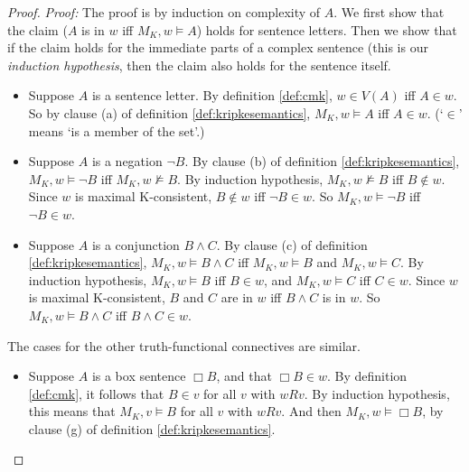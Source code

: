 \begin{proof}
  \emph{Proof:} The proof is by induction on complexity of $A$. We first show
  that the claim ($A$ is in $w$ iff $M_{K},w\models A$) holds for sentence
  letters. Then we show that if the claim holds for the immediate parts of a
  complex sentence (this is our \emph{induction hypothesis}, then the claim also
  holds for the sentence itself.%
  \vspace{-1mm}
  \begin{itemize}
    \itemsep0mm
    \item Suppose $A$ is a sentence letter. By definition \ref{def:cmk},
          $w\in V(A)$ iff $A\in w$. So by clause (a) of definition
          \ref{def:kripkesemantics}, $M_K,w \models A$ iff $A \in w$. (`$\in$'
          means `is a member of the set'.)
  
    \item Suppose $A$ is a negation $\neg B$. By clause (b) of definition
          \ref{def:kripkesemantics}, $M_K,w \models \neg B$ iff
          $M_K,w \not\models B$. By induction hypothesis, $M_K,w\not\models B$
          iff $B \not\in w$. Since $w$ is maximal K-consistent, $B \not\in w$
          iff $\neg B \in w$. So $M_K,w \models \neg B$ iff $\neg B \in w$.
        
    \item Suppose $A$ is a conjunction $B\land C$. By clause (c) of definition
          \ref{def:kripkesemantics}, $M_K,w \models B\land C$ iff
          $M_K,w \models B$ and $M_K,w \models C$. By induction hypothesis,
          $M_K,w \models B$ iff $B\in w$, and $M_K,w \models C$ iff $C\in w$.
          Since $w$ is maximal K-consistent, $B$ and $C$ are in $w$ iff
          $B\land C$ is in $w$.
          So $M_K,w \models B \land C$ iff $B \land C \in w$.
  \end{itemize}
  The cases for the other truth-functional connectives are similar.
  \begin{itemize}
    \itemsep0mm
    \item Suppose $A$ is a box sentence $\Box B$, and that $\Box B \in w$. By
          definition \ref{def:cmk}, it follows that $B\in v$ for all $v$ with
          $wRv$. By induction hypothesis, this means that $M_K,v \models B$ for
          all $v$ with $wRv$. And then $M_K,w \models \Box B$, by clause (g) of
          definition \ref{def:kripkesemantics}.


\end{itemize}
\end{proof}

